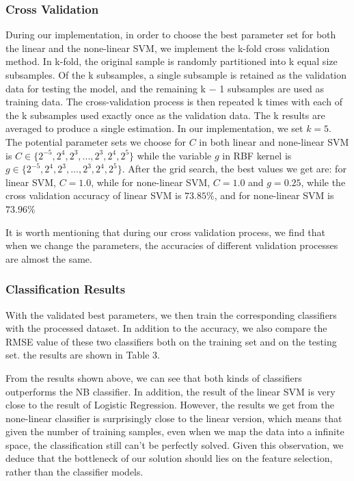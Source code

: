 \documentclass{article} %
\begin{document}
\subsubsection{Cross Validation}
During our implementation, in order to choose the best parameter set for both the linear and the none-linear SVM, we implement the k-fold cross validation method. In k-fold, the original sample is randomly partitioned into k equal size subsamples. Of the k subsamples, a single subsample is retained as the validation data for testing the model, and the remaining k − 1 subsamples are used as training data. The cross-validation process is then repeated k times with each of the k subsamples used exactly once as the validation data. The k results are averaged to produce a single estimation. In our implementation, we set $k=5$. The potential parameter sets we choose for $C$ in both linear and none-linear SVM is $C\in \{2^{-5},2^4,2^3,...,2^3,2^4,2^5\}$ while the variable $g$ in RBF kernel is $g\in \{2^{-5},2^4,2^3,...,2^3,2^4,2^5\}$. After the grid search, the best values we get are: for linear SVM, $C=1.0$, while for none-linear SVM, $C=1.0$ and $g=0.25$, while the cross validation accuracy of linear SVM is $73.85\%$, and for none-linear SVM is $73.96\%$

It is worth mentioning that during our cross validation process, we find that when we change the parameters, the accuracies of different validation processes are almost the same.   

\subsubsection{Classification Results}
With the validated best parameters, we then train the corresponding classifiers with the processed dataset. In addition to the accuracy, we also compare the RMSE value of these two classifiers both on the training set and on the testing set. the results are shown in Table 3.

From the results shown above, we can see that both kinds of classifiers outperforms the NB classifier. In addition, the result of the linear SVM is very close to the result of Logistic Regression. However, the results we get from the none-linear classifier is surprisingly close to the linear version, which means that given the number of training samples, even when we map the data into a infinite space, the classification still can't be perfectly solved. Given this observation, we deduce that the bottleneck of our solution should lies on the feature selection, rather than the classifier models. 
\end{document}
